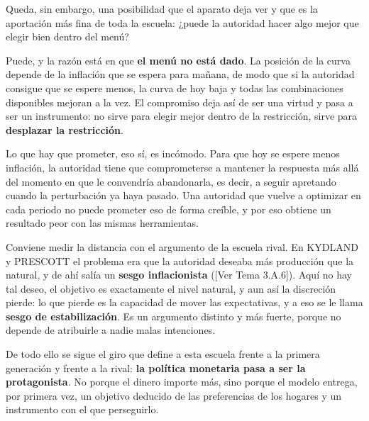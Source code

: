 \documentclass[10pt,a4paper]{article}
\newcommand{\authorfont}[1]{{\fontfamily{EBGaramond-TLF}\selectfont #1}}
\begin{document}
Queda, sin embargo, una posibilidad que el aparato deja ver y que es la aportación más fina de toda la escuela: ¿puede la autoridad hacer algo mejor que elegir bien dentro del menú?

Puede, y la razón está en que \textbf{el menú no está dado}. La posición de la curva depende de la inflación que se espera para mañana, de modo que si la autoridad consigue que se espere menos, la curva de hoy baja y todas las combinaciones disponibles mejoran a la vez. El compromiso deja así de ser una virtud y pasa a ser un instrumento: no sirve para elegir mejor dentro de la restricción, sirve para \textbf{desplazar la restricción}.

Lo que hay que prometer, eso sí, es incómodo. Para que hoy se espere menos inflación, la autoridad tiene que comprometerse a mantener la respuesta más allá del momento en que le convendría abandonarla, es decir, a seguir apretando cuando la perturbación ya haya pasado. Una autoridad que vuelve a optimizar en cada periodo no puede prometer eso de forma creíble, y por eso obtiene un resultado peor con las mismas herramientas.

Conviene medir la distancia con el argumento de la escuela rival. En KYDLAND y PRESCOTT el problema era que la autoridad deseaba más producción que la natural, y de ahí salía un \textbf{sesgo inflacionista} ([\authorfont{Ver Tema 3.A.6}]). Aquí no hay tal deseo, el objetivo es exactamente el nivel natural, y aun así la discreción pierde: lo que pierde es la capacidad de mover las expectativas, y a eso se le llama \textbf{sesgo de estabilización}. Es un argumento distinto y más fuerte, porque no depende de atribuirle a nadie malas intenciones.

De todo ello se sigue el giro que define a esta escuela frente a la primera generación y frente a la rival: \textbf{la política monetaria pasa a ser la protagonista}. No porque el dinero importe más, sino porque el modelo entrega, por primera vez, un objetivo deducido de las preferencias de los hogares y un instrumento con el que perseguirlo.













\clearpage
\end{document}
